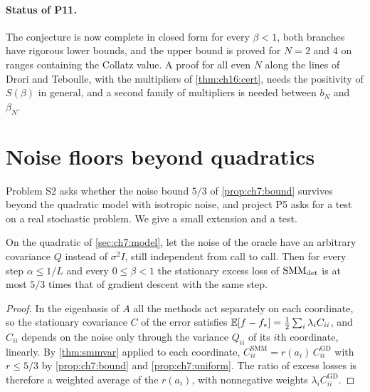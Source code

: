 \paragraph{Status of P11.} The conjecture is now complete in closed form for
every $\beta<1$, both branches have rigorous lower bounds, and the upper bound is
proved for $N=2$ and $4$ on ranges containing the Collatz value. A proof for all
even $N$ along the lines of Drori and Teboulle, with the multipliers of
\cref{thm:ch16:cert}, needs the positivity of $S(\beta)$ in general, and a second
family of multipliers is needed between $b_N$ and $\beta_N$.

\section{Noise floors beyond quadratics}\label{sec:ch16:s2}

Problem S2 asks whether the noise bound $5/3$ of \cref{prop:ch7:bound} survives
beyond the quadratic model with isotropic noise, and project P5 asks for a test
on a real stochastic problem. We give a small extension and a test.

\begin{proposition}\label{prop:ch16:correlated}
On the quadratic of \cref{sec:ch7:model}, let the noise of the oracle have an
arbitrary covariance $Q$ instead of $\sigma^2I$, still independent from call to
call. Then for every step $\alpha\le1/L$ and every $0\le\beta<1$ the stationary excess loss
of $\mathrm{SMM}_{\mathrm{det}}$ is at most $5/3$ times that of gradient descent with the same step.
\end{proposition}

\begin{proof}
In the eigenbasis of $A$ all the methods act separately on each coordinate, so
the stationary covariance $C$ of the error satisfies
$\mathbb{E}[f-f_*]=\tfrac{1}{2}\sum_i\lambda_iC_{ii}$, and $C_{ii}$ depends on the noise only through
the variance $Q_{ii}$ of its $i$th coordinate, linearly. By \cref{thm:smmvar}
applied to each coordinate, $C_{ii}^{\mathrm{SMM}}=r(a_i)\,C_{ii}^{\mathrm{GD}}$ with
$r\le5/3$ by \cref{prop:ch7:bound} and \cref{prop:ch7:uniform}. The ratio of
excess losses is therefore a weighted average of the $r(a_i)$, with nonnegative
weights $\lambda_iC_{ii}^{\mathrm{GD}}$.
\end{proof}

